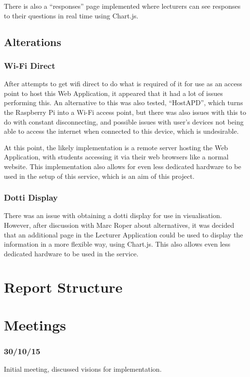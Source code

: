 \documentclass{article}
\begin{document}
There is also a ``responses'' page implemented where lecturers can see responses to their questions in real time using Chart.js.

\subsection{Alterations}
\subsubsection {Wi-Fi Direct}
After attempts to get wifi direct to do what is required of it for use as an access point to host this Web Application, it appeared that it had a lot of issues performing this. An alternative to this was also tested, ``HostAPD'', which turns the Raspberry Pi into a Wi-Fi access point, but there was also issues with this to do with constant disconnecting, and possible issues with user's devices not being able to access the internet when connected to this device, which is undesirable.

At this point, the likely implementation is a remote server hosting the Web Application, with students accessing it via their web browsers like a normal website. This implementation also allows for even less dedicated hardware to be used in the setup of this service, which is an aim of this project.

\subsubsection{Dotti Display}
There was an issue with obtaining a dotti display for use in visualisation. However, after discussion with Marc Roper about alternatives, it was decided that an additional page in the Lecturer Application could be used to display the information in a more flexible way, using Chart.js. This also allows even less dedicated hardware to be used in the service.

\section{Report Structure}

\section{Meetings}
\subsubsection{30/10/15}
Initial meeting, discussed visions for implementation.
\end{document}
